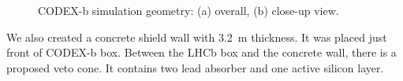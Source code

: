 
\begin{figure}
\centering
{}
\caption{
    CODEX-b simulation geometry: (a) overall, (b) close-up view. 
}
\end{figure}

We also created a concrete shield wall with 3.2~m thickness.
It was placed just front of CODEX-b box.
Between the LHCb box and the concrete wall, there is a proposed veto cone.
It contains two lead absorber and one active silicon layer.

